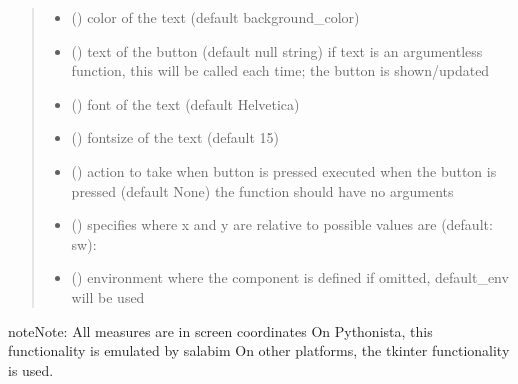 \documentclass[letterpaper,10pt,english]{sphinxmanual}
\begin{document}
\begin{fulllineitems}
\begin{quote}
\begin{description}
\begin{itemize}
\item {} 
 () \textendash{} color of the text (default background\_color)

\item {} 
 () \textendash{} text of the button (default null string) 
if text is an argumentless function, this will be called each time;
the button is shown/updated

\item {} 
 () \textendash{} font of the text (default Helvetica)

\item {} 
 () \textendash{} fontsize of the text (default 15)

\item {} 
 () \textendash{} action to take when button is pressed 
executed when the button is pressed (default None)
the function should have no arguments 

\item {} 
 () \textendash{} specifies where x and y are relative to 
possible values are (default: sw): 

\item {} 
 ({\hyperref[\detokenize{Reference:salabim.Environment}]{}}) \textendash{} environment where the component is defined 
if omitted, default\_env will be used

\end{itemize}

\end{description}\end{quote}

\begin{sphinxadmonition}{note}{Note:}
All measures are in screen coordinates 
On Pythonista, this functionality is emulated by salabim
On other platforms, the tkinter functionality is used.
\end{sphinxadmonition}


\end{fulllineitems}
\end{document}
